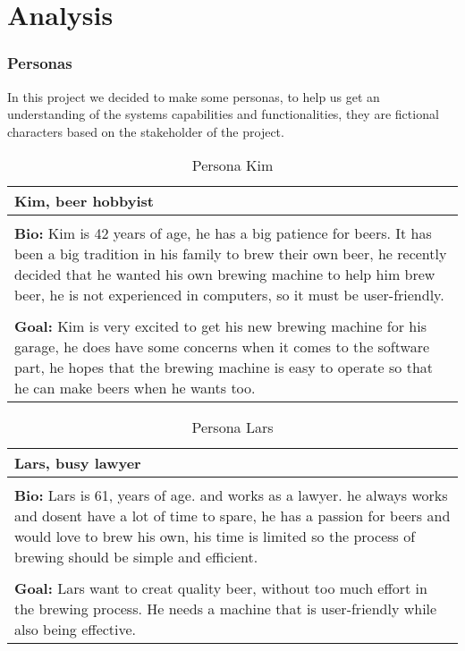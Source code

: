\section{Analysis}
\subsubsection{Personas}
In this project we decided to make some personas, to help us get an understanding of the systems capabilities and functionalities, they are fictional characters based on the stakeholder of the project. \newline

\begin{table}[htb]
    \begin{center}
        \begin{tabular}{|p{16cm}|}
        \hline
        \textbf{Kim, beer hobbyist} \\
        \hline
        \\ \textbf{Bio:} Kim is 42 years of age, he has a big patience for beers. It has been a big tradition in his family to brew their own beer, he recently decided that he wanted his own brewing machine to help him brew beer, he is not experienced in computers, so it must be user-friendly.  \\
        \\
        \textbf{Goal:} Kim is very excited to get his new brewing machine for his garage, he does have some concerns when it comes to the software part, he hopes that the brewing machine is easy to operate so that he can make beers when he wants too. \\
        \hline
        \end{tabular}
        \caption{Persona Kim}
        \label{tab:persona_kim}
    \end{center}
\end{table}

\begin{table}[htb]
    \begin{center}
        \begin{tabular}{|p{16cm}|}
        \hline
        \textbf{Lars, busy lawyer} \\
        \hline
        \\ \textbf{Bio:} Lars is 61, years of age. and works as a lawyer. he always works and dosent have a lot of time to spare, he has a passion for beers and would love to brew his own, his time is limited so the process of brewing should be simple and efficient.  \\
        \\
        \textbf{Goal:} Lars want to creat quality beer, without too much effort in the brewing process. He needs a machine that is user-friendly while also being effective. \\
        \hline
        \end{tabular}
        \caption{Persona Lars}
        \label{tab:persona_lars}
    \end{center}
\end{table}

